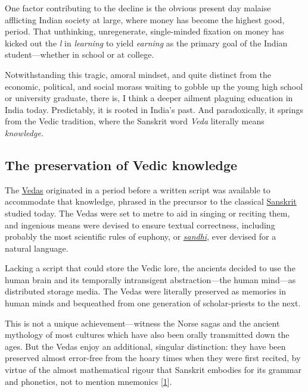 \documentclass[
  a4paper,
]{article}
\begin{document}
One factor contributing to the decline is the obvious present day
malaise afflicting Indian society at large, where money has become the
highest good, period. That unthinking, unregenerate, single-minded
fixation on money has kicked out the \emph{l} in \emph{learning} to
yield \emph{earning} as the primary goal of the Indian student---whether
in school or at college.

Notwithstanding this tragic, amoral mindset, and quite distinct from the
economic, political, and social morass waiting to gobble up the young
high school or university graduate, there is, I think a deeper ailment
plaguing education in India today. Predictably, it is rooted in India's
past. And paradoxically, it springs from the Vedic tradition, where the
Sanskrit word \emph{Veda} literally means \emph{knowledge.}

\hypertarget{the-preservation-of-vedic-knowledge}{%
\subsection{The preservation of Vedic
knowledge}\label{the-preservation-of-vedic-knowledge}}

The \href{http://en.wikipedia.org/wiki/Vedas}{Vedas} originated in a
period before a written script was available to accommodate that
knowledge, phrased in the precursor to the classical
\href{http://en.wikipedia.org/wiki/Sanskrit}{Sanskrit} studied today.
The Vedas were set to metre to aid in singing or reciting them, and
ingenious means were devised to ensure textual correctness, including
probably the most scientific rules of euphony, or
\href{https://en.wikipedia.org/wiki/Sandhi}{\emph{sandhi}}, ever devised
for a natural language.

Lacking a script that could store the Vedic lore, the ancients decided
to use the human brain and its temporally intransigent abstraction---the
human mind---as distributed storage media. The Vedas were literally
preserved as memories in human minds and bequeathed from one generation
of scholar-priests to the next.

This is not a unique achievement---witness the Norse sagas and the
ancient mythology of most cultures which have also been orally
transmitted down the ages. But the Vedas enjoy an additional, singular
distinction: they have been preserved almost error-free from the hoary
times when they were first recited, by virtue of the almost mathematical
rigour that Sanskrit embodies for its grammar and phonetics, not to
mention mnemonics {[}\protect\hyperlink{ref-bhatekak1993}{1}{]}.
\end{document}
